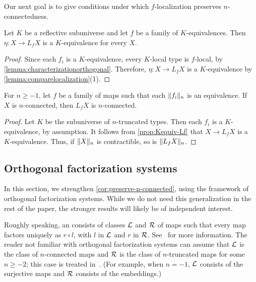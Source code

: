 \medskip

Our next goal is to give conditions under which $f$-localization
preserves $n$-connected\-ness.

\begin{prp}\label{prop:Kequiv-Lf}
Let $K$ be a reflective subuniverse and let $f$ be a family of $K$-equiva\-lences.
Then $\eta : X \to L_f X$ is a $K$-equivalence for every $X$.
\end{prp}

\begin{proof}
Since each $f_i$ is a $K$-equivalence, every $K$-local type is $f$-local,
by \cref{lemma:characterizationorthogonal}.
Therefore, $\eta : X \to L_f X$ is a $K$-equivalence
by \cref{lemma:comparelocalization}(1).
\end{proof}

\begin{cor}\label{cor:preserve-n-connected}
For $n \geq -1$, let $f$ be a family of maps such that each $\trunc{n}{f_i}$ is an equivalence.
If $X$ is $n$-connected, then $L_f X$ is $n$-connected.
\end{cor}

\begin{proof}
Let $K$ be the subuniverse of $n$-truncated types.
Then each $f_i$ is a $K$-equivalence, by assumption.
It follows from \cref{prop:Kequiv-Lf} that $X \to L_f X$ is a $K$-equivalence.
Thus, if $\trunc{n}{X}$ is contractible, so is $\trunc{n}{L_f X}$.
\end{proof}

\subsection{Orthogonal factorization systems}\label{ss:orthogonal-factorization-systems}

In this section, we strengthen \cref{cor:preserve-n-connected}, using
the framework of orthogonal factorization systems.
While we do not need this generalization in the rest of the paper,
the stronger results will likely be of independent interest.

Roughly speaking, an  consists of
classes $\LLL$ and $\RRR$ of maps such that every map factors uniquely as
$r \circ l$, with $l$ in $\LLL$ and $r$ in $\RRR$.
See~\cite{RijkeShulmanSpitters} for more information.
The reader not familiar with orthogonal factorization systems can assume
that $\LLL$ is the class of $n$-connected maps
and $\RRR$ is the class of $n$-truncated maps for some $n \geq -2$;
this case is treated in~\cite[Section 7.6]{hottbook}.
(For example, when $n = -1$, $\LLL$ consists of the surjective maps
and $\RRR$ consists of the embeddings.)

